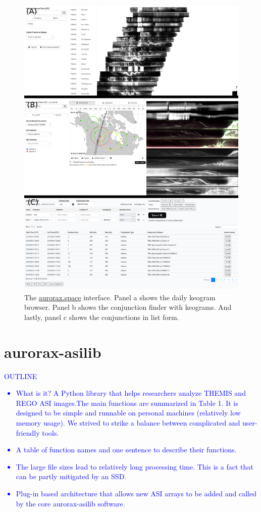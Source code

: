 \documentclass[draft]{agujournal2019}
\begin{document}
\begin{figure}
      \includegraphics[width=\textwidth]{figures/fig1.png}
      \caption{The \url{aurorax.space} interface. Panel a shows the daily keogram browser. Panel b shows the conjunction finder with keograms. And lastly, panel c shows the conjunctions in list form.}
      \label{fig1}
\end{figure}

\section{aurorax-asilib}\label{aurorax-asilib}
\textcolor{blue}{
      OUTLINE
      \begin{itemize}
            \item What is it? A Python library that helps researchers analyze THEMIS and REGO ASI images.The main functions are summarized in Table 1. It is designed to be simple and runnable on personal machines (relatively low memory usage). We strived to strike a balance between complicated and user-friendly tools.
            \item A table of function names and one sentence to describe their functions.
            \item The large file sizes lead to relatively long processing time. This is a fact that can be partly mitigated by an SSD. 
            \item Plug-in based architecture that allows new ASI arrays to be added and called by the core aurorax-asilib software.
      \end{itemize}
}
\end{document}
